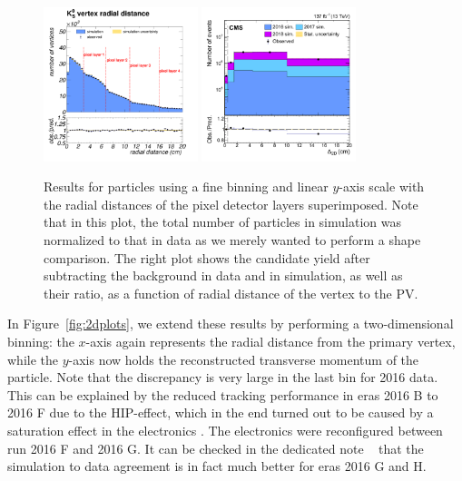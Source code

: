\begin{figure}[h!]
    \centering
    \includegraphics[width=0.40\textwidth]{Figures/c6/efficiencies/2017E_detector}
    \includegraphics[width=0.40\textwidth]{Figures/paper/K_short_Displacement.pdf}
    \caption{Results for \PKzS particles using a fine binning and
      linear $y$-axis scale with the radial distances of the pixel
      detector layers superimposed. Note that in this plot, the total
      number of \PKzS particles in simulation was normalized to that
      in data as we merely wanted to perform a shape comparison.
      The right plot shows the \PKzS candidate yield after subtracting
      the background in data and in simulation, as well as their
      ratio, as a function of radial distance of the \PKzS vertex to
      the PV. \luka}
    \label{fig:2017_detector}
\end{figure}

In Figure~\ref{fig:2dplots}, we extend these results by performing a
two-dimensional binning: the $x$-axis again represents the radial
distance from the primary vertex, while the $y$-axis now holds the
reconstructed transverse momentum of the particle. 
Note that the discrepancy is very large in the last bin for 2016
data. This can be explained by the reduced tracking performance in
eras 2016 B to 2016 F due to the HIP-effect, which in the end turned
out to be caused by a saturation effect in the electronics
\cite{hipeffect}. The electronics were reconfigured between run 2016 F
and 2016 G. It can be checked in the dedicated note
~\cite{AN-20-111_KshortStudy} that the simulation to data agreement is
in fact much better for eras 2016 G and H. 

